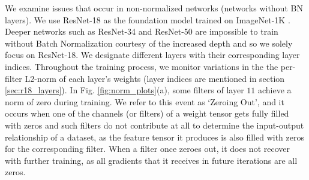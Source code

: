 \documentclass[runningheads]{llncs}
\begin{document}
We examine issues that occur in non-normalized networks (networks without BN layers). We
use ResNet-18 \cite{he2016deep} as the foundation model trained on ImageNet-1K
\cite{russakovsky2015imagenet}. Deeper networks such as ResNet-34 and ResNet-50 are
impossible to train without Batch Normalization courtesy of the increased depth and so
we solely focus on ResNet-18. We designate different layers with their corresponding
layer indices. Throughout the training process, we monitor variations in the the
per-filter L2-norm of each layer's weights (layer indices are mentioned in section
\ref{sec:r18_layers}). In Fig. \ref{fig:norm_plots}(a), some filters of layer $11$
achieve a norm of zero during training. We refer to this event as `Zeroing Out', and it
occurs when one of the channels (or filters) of a weight tensor gets fully filled with
zeros and such filters do not contribute at all to determine the input-output
relationship of a dataset, as the feature tensor it produces is also filled with zeros
for the corresponding filter. When a filter once zeroes out, it does not recover with
further training, as all gradients that it receives in future iterations are all zeros. 
\end{document}
